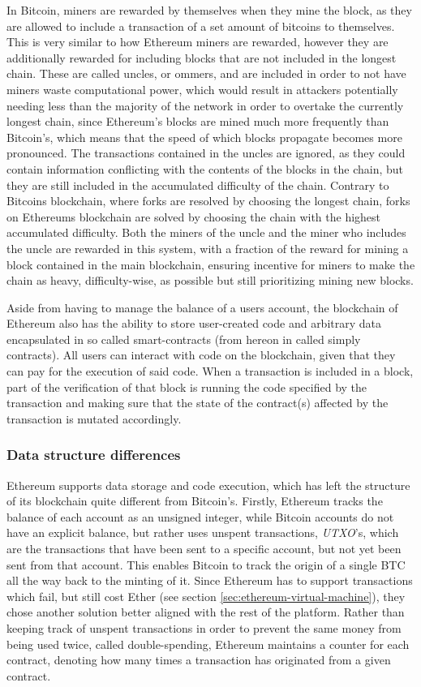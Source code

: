 \documentclass{article}
\begin{document}
		In Bitcoin, miners are rewarded by themselves when they mine the block, as they are allowed to include a transaction of a set amount of bitcoins to themselves.
		This is very similar to how Ethereum miners are rewarded, however they are additionally rewarded for including blocks that are not included in the longest chain.
		These are called uncles, or ommers, and are included in order to not have miners waste computational power, which would result in attackers potentially needing less than the majority of the network in order to overtake the currently longest chain, since Ethereum's blocks are mined much more frequently than Bitcoin's, which means that the speed of which blocks propagate becomes more pronounced. 
		The transactions contained in the uncles are ignored, as they could contain information conflicting with the contents of the blocks in the chain, but they are still included in the accumulated difficulty of the chain. Contrary to Bitcoins blockchain, where forks are resolved by choosing the longest chain, forks on Ethereums blockchain are solved by choosing the chain with the highest accumulated difficulty.
		Both the miners of the uncle and the miner who includes the uncle are rewarded in this system, with a fraction of the reward for mining a block contained in the main blockchain, ensuring incentive for miners to make the chain as heavy, difficulty-wise, as possible but still prioritizing mining new blocks.

		Aside from having to manage the balance of a users account, the blockchain of Ethereum also has the ability to store user-created code and arbitrary data encapsulated in so called smart-contracts (from hereon in called simply contracts). All users can interact with code on the blockchain, given that they can pay for the execution of said code. 
		When a transaction is included in a block, part of the verification of that block is running the code specified by the transaction and making sure that the state of the contract(s) affected by the transaction is mutated accordingly.

			\subsubsection{Data structure differences}
			Ethereum supports data storage and code execution, which has left the structure of its blockchain quite different from Bitcoin's.
			Firstly, Ethereum tracks the balance of each account as an unsigned integer, while Bitcoin accounts do not have an explicit balance, but rather uses unspent transactions, \emph{UTXO}'s, which are the transactions that have been sent to a specific account, but not yet been sent from that account. 
			This enables Bitcoin to track the origin of a single BTC all the way back to the minting of it.
			Since Ethereum has to support transactions which fail, but still cost Ether (see section \ref{sec:ethereum-virtual-machine}), they chose another solution better aligned with the rest of the platform.
			Rather than keeping track of unspent transactions in order to prevent the same money from being used twice, called double-spending, Ethereum maintains a counter for each contract, denoting how many times a transaction has originated from a given contract.
\end{document}
